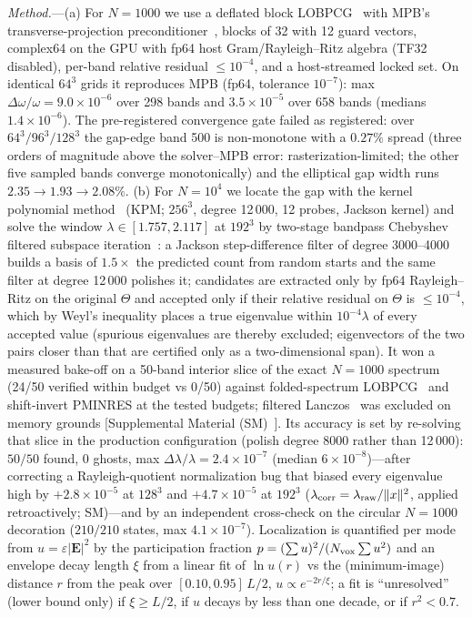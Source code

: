 \documentclass[prl,twocolumn,superscriptaddress,showpacs]{revtex4-2}
\begin{document}
\emph{Method.}---(a) For $N=1000$ we use a deflated block LOBPCG~\cite{Knyazev2001,Duersch2018} with MPB's transverse-projection preconditioner~\cite{Johnson2001}, blocks of 32 with 12 guard vectors, complex64 on the GPU with fp64 host Gram/Rayleigh--Ritz algebra (TF32 disabled), per-band relative residual $\le10^{-4}$, and a host-streamed locked set. On identical $64^3$ grids it reproduces MPB (fp64, tolerance $10^{-7}$): max $\Delta\omega/\omega=9.0\times10^{-6}$ over 298 bands and $3.5\times10^{-5}$ over 658 bands (medians $1.4\times10^{-6}$). The pre-registered convergence gate failed as registered: over $64^3/96^3/128^3$ the gap-edge band 500 is non-monotone with a $0.27\%$ spread (three orders of magnitude above the solver--MPB error: rasterization-limited; the other five sampled bands converge monotonically) and the elliptical gap width runs $2.35\to1.93\to2.08\%$. (b) For $N=10^4$ we locate the gap with the kernel polynomial method~\cite{Weisse2006,Lin2016} (KPM; $256^3$, degree 12\,000, 12 probes, Jackson kernel) and solve the window $\lambda\in[1.757,2.117]$ at $192^3$ by two-stage bandpass Chebyshev filtered subspace iteration~\cite{Zhou2006,Pieper2016,Li2019,Winkelmann2019}: a Jackson step-difference filter of degree 3000--4000 builds a basis of $1.5\times$ the predicted count from random starts and the same filter at degree 12\,000 polishes it; candidates are extracted only by fp64 Rayleigh--Ritz on the original $\Theta$ and accepted only if their relative residual on $\Theta$ is $\le10^{-4}$, which by Weyl's inequality places a true eigenvalue within $10^{-4}\lambda$ of every accepted value (spurious eigenvalues are thereby excluded; eigenvectors of the two pairs closer than that are certified only as a two-dimensional span). It won a measured bake-off on a 50-band interior slice of the exact $N=1000$ spectrum (24/50 verified within budget vs 0/50) against folded-spectrum LOBPCG~\cite{Wang1994,Vomel2008} and shift-invert PMINRES at the tested budgets; filtered Lanczos~\cite{FangSaad2012} was excluded on memory grounds [Supplemental Material (SM)~\cite{SM}]. Its accuracy is set by re-solving that slice in the production configuration (polish degree 8000 rather than 12\,000): $50/50$ found, 0 ghosts, max $\Delta\lambda/\lambda=2.4\times10^{-7}$ (median $6\times10^{-8}$)---after correcting a Rayleigh-quotient normalization bug that biased every eigenvalue high by $+2.8\times10^{-5}$ at $128^3$ and $+4.7\times10^{-5}$ at $192^3$ ($\lambda_{\rm corr}=\lambda_{\rm raw}/\|x\|^2$, applied retroactively; SM)---and by an independent cross-check on the circular $N=1000$ decoration ($210/210$ states, max $4.1\times10^{-7}$). Localization is quantified per mode from $u=\varepsilon|\bm E|^2$ by the participation fraction $p=(\sum u)^2/(N_{\rm vox}\sum u^2)$ and an envelope decay length $\xi$ from a linear fit of $\ln u(r)$ vs the (minimum-image) distance $r$ from the peak over $[0.10,0.95]\,L/2$, $u\propto e^{-2r/\xi}$; a fit is ``unresolved'' (lower bound only) if $\xi\ge L/2$, if $u$ decays by less than one decade, or if $r^2<0.7$.
\end{document}

